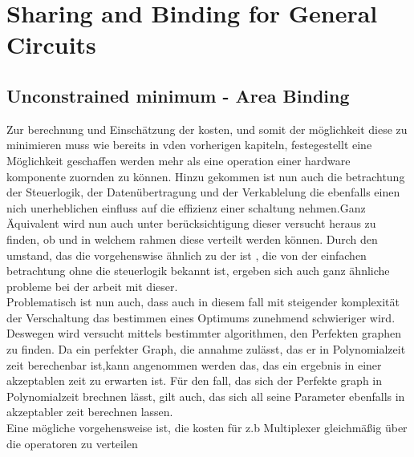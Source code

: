 \documentclass[conference]{IEEEtran}
\begin{document}
\section{Sharing and Binding for General Circuits}
\subsection{Unconstrained minimum - Area Binding}
Zur berechnung und Einschätzung der kosten, und somit der möglichkeit diese zu minimieren muss wie bereits in vden vorherigen kapiteln, festegestellt eine Möglichkeit geschaffen werden mehr als eine operation einer hardware komponente zuornden zu können. Hinzu gekommen ist nun auch die betrachtung der Steuerlogik, der Datenübertragung und der Verkablelung die ebenfalls einen nich unerheblichen einfluss auf die effizienz einer schaltung nehmen.Ganz Äquivalent wird nun auch unter berücksichtigung dieser versucht heraus zu finden, ob und in welchem rahmen diese verteilt werden können. Durch den umstand, das die vorgehenswise ähnlich zu der ist , die von der einfachen betrachtung ohne die steuerlogik bekannt ist, ergeben sich auch ganz ähnliche probleme bei der arbeit mit dieser.\\
Problematisch ist nun auch, dass auch in diesem fall mit steigender komplexität der Verschaltung das bestimmen eines Optimums zunehmend schwieriger wird. Deswegen wird versucht mittels bestimmter algorithmen, den Perfekten graphen zu finden. 
Da ein perfekter Graph, die annahme zulässt, das er in Polynomialzeit zeit berechenbar ist,kann angenommen werden das, das ein ergebnis in einer akzeptablen zeit zu erwarten ist. Für den fall, das sich der Perfekte graph in Polynomialzeit brechnen lässt, gilt auch, das sich all seine Parameter ebenfalls in akzeptabler zeit berechnen lassen\cite[S. 60]{6}.\\
Eine mögliche vorgehensweise ist, die kosten für z.b Multiplexer gleichmäßig über die operatoren zu verteilen\cite[S.247]{3}
\end{document}
